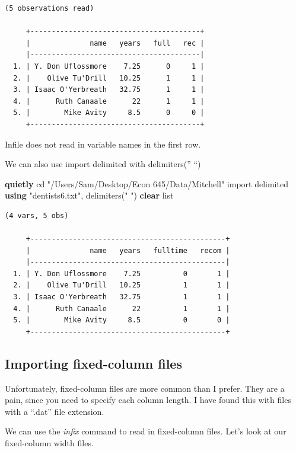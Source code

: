 \documentclass[
]{book}
\newenvironment{Shaded}{\begin{snugshade}}{\end{snugshade}}
\newcommand{\KeywordTok}[1]{\textcolor[rgb]{0.13,0.29,0.53}{\textbf{#1}}}
\newcommand{\NormalTok}[1]{#1}
\newcommand{\OtherTok}[1]{\textcolor[rgb]{0.56,0.35,0.01}{#1}}
\newcommand{\StringTok}[1]{\textcolor[rgb]{0.31,0.60,0.02}{#1}}
\begin{document}
\begin{verbatim}
(5 observations read)

     +----------------------------------------+
     |              name   years   full   rec |
     |----------------------------------------|
  1. | Y. Don Uflossmore    7.25      0     1 |
  2. |    Olive Tu'Drill   10.25      1     1 |
  3. | Isaac O'Yerbreath   32.75      1     1 |
  4. |      Ruth Canaale      22      1     1 |
  5. |        Mike Avity     8.5      0     0 |
     +----------------------------------------+
\end{verbatim}

Infile does not read in variable names in the first row.

We can also use import delimited with delimiters('' ``)

\begin{Shaded}
\begin{Highlighting}[]
\KeywordTok{quietly}\NormalTok{ cd }\StringTok{"/Users/Sam/Desktop/Econ 645/Data/Mitchell"}
\NormalTok{import delimited }\KeywordTok{using} \StringTok{"dentists6.txt"}\NormalTok{, delimiters(}\StringTok{" "}\NormalTok{) }\KeywordTok{clear}
\OtherTok{list}
\end{Highlighting}
\end{Shaded}

\begin{verbatim}
(4 vars, 5 obs)

     +----------------------------------------------+
     |              name   years   fulltime   recom |
     |----------------------------------------------|
  1. | Y. Don Uflossmore    7.25          0       1 |
  2. |    Olive Tu'Drill   10.25          1       1 |
  3. | Isaac O'Yerbreath   32.75          1       1 |
  4. |      Ruth Canaale      22          1       1 |
  5. |        Mike Avity     8.5          0       0 |
     +----------------------------------------------+
\end{verbatim}

\subsection{Importing fixed-column files}\label{importing-fixed-column-files}

Unfortunately, fixed-column files are more common than I prefer. They are a pain, since you need to specify each column length. I have found this with files with a ``.dat'' file extension.

We can use the \emph{infix} command to read in fixed-column files. Let's look at our fixed-column width files.
\end{document}

